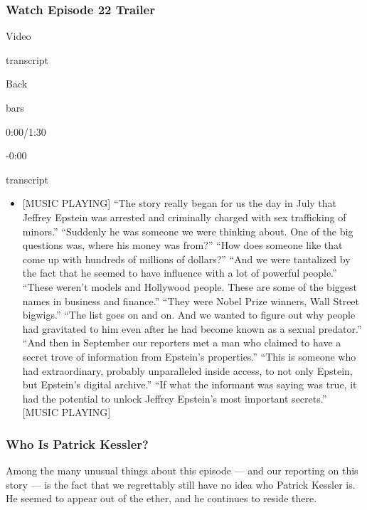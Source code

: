\hypertarget{watch-episode-22-trailer}{%
\subsubsection{Watch Episode 22
Trailer}\label{watch-episode-22-trailer}}

Video

transcript

Back

bars

0:00/1:30

-0:00

transcript

\begin{itemize}
\tightlist
\item
  {[}MUSIC PLAYING{]} ``The story really began for us the day in July
  that Jeffrey Epstein was arrested and criminally charged with sex
  trafficking of minors.'' ``Suddenly he was someone we were thinking
  about. One of the big questions was, where his money was from?'' ``How
  does someone like that come up with hundreds of millions of dollars?''
  ``And we were tantalized by the fact that he seemed to have influence
  with a lot of powerful people.'' ``These weren't models and Hollywood
  people. These are some of the biggest names in business and finance.''
  ``They were Nobel Prize winners, Wall Street bigwigs.'' ``The list
  goes on and on. And we wanted to figure out why people had gravitated
  to him even after he had become known as a sexual predator.'' ``And
  then in September our reporters met a man who claimed to have a secret
  trove of information from Epstein's properties.'' ``This is someone
  who had extraordinary, probably unparalleled inside access, to not
  only Epstein, but Epstein's digital archive.'' ``If what the informant
  was saying was true, it had the potential to unlock Jeffrey Epstein's
  most important secrets.'' {[}MUSIC PLAYING{]}
\end{itemize}

\hypertarget{who-is-patrick-kessler}{%
\subsubsection{\texorpdfstring{\textbf{Who Is Patrick
Kessler?}}{Who Is Patrick Kessler?}}\label{who-is-patrick-kessler}}

Among the many unusual things about this episode --- and our reporting
on this story --- is the fact that we regrettably still have no idea who
Patrick Kessler is. He seemed to appear out of the ether, and he
continues to reside there.

